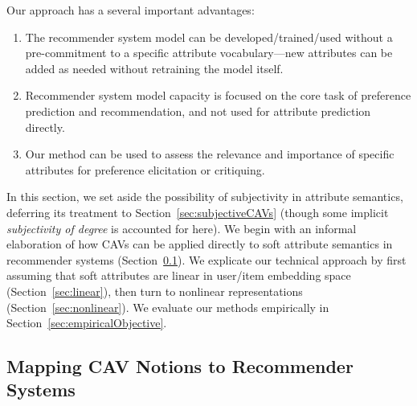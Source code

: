 \documentclass[manuscript,screen,nonacm]{acmart}
\newcommand{\1}{{\mathbf 1}}
\theoremstyle{TheoremNum}
\begin{document}
Our approach has a several important advantages:
\begin{enumerate}[(1)]
\item The recommender system model can be developed/trained/used without a pre-commitment to a specific attribute vocabulary---new attributes can be added as needed without retraining the model itself.
\item Recommender system model capacity is focused on the core task of preference prediction and recommendation, and not used for attribute prediction directly.
\item Our method can be used to assess the relevance and importance of specific attributes for preference elicitation or critiquing.
\end{enumerate}
% 
In this section, we set aside 
the possibility of
subjectivity in attribute semantics, deferring its treatment to Section~\ref{sec:subjectiveCAVs} (though some implicit \emph{subjectivity of degree} is accounted for here). We begin with an informal elaboration of how CAVs can be applied directly to soft attribute semantics in recommender systems (Section~\ref{sec:mapping}). We explicate our technical approach by first assuming that soft attributes are linear in user/item embedding space (Section~\ref{sec:linear}), then turn to nonlinear representations (Section~\ref{sec:nonlinear}). We evaluate our methods empirically in Section~\ref{sec:empiricalObjective}.

\subsection{Mapping CAV Notions to Recommender Systems}
\label{sec:mapping}
\end{document}
